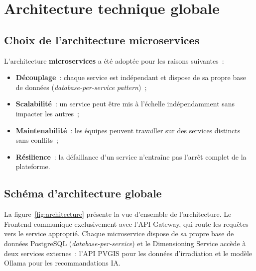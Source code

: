 \section{Architecture technique globale}

\subsection{Choix de l'architecture microservices}

L'architecture \textbf{microservices} a été adoptée pour les raisons suivantes~:
\begin{itemize}
  \item \textbf{Découplage}~: chaque service est indépendant et dispose de sa
    propre base de données (\textit{database-per-service pattern})~;
  \item \textbf{Scalabilité}~: un service peut être mis à l'échelle
    indépendamment sans impacter les autres~;
  \item \textbf{Maintenabilité}~: les équipes peuvent travailler sur des services
    distincts sans conflits~;
  \item \textbf{Résilience}~: la défaillance d'un service n'entraîne pas
    l'arrêt complet de la plateforme.
\end{itemize}

\subsection{Schéma d'architecture globale}

La figure~\ref{fig:architecture} présente la vue d'ensemble de l'architecture.
Le Frontend communique exclusivement avec l'API Gateway, qui route les requêtes
vers le service approprié. Chaque microservice dispose de sa propre base de
données PostgreSQL (\textit{database-per-service}) et le Dimensioning Service
accède à deux services externes~: l'API PVGIS pour les données d'irradiation
et le modèle Ollama pour les recommandations IA.


